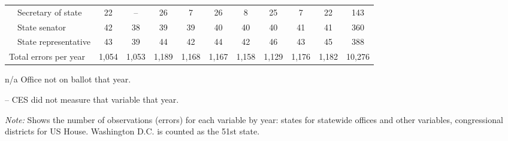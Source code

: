 \begin{table}[!htbp]
{\begin{threeparttable}
\begin{tabular}{lcccccccccc}
~~Secretary of state & 22 & -- & 26 & 7 & 26 & 8 & 25 & 7 & 22 & 143 \\
~~State senator & 42 & 38 & 39 & 39 & 40 & 40 & 40 & 41 & 41 & 360 \\
~~State representative & 43 & 39 & 44 & 42 & 44 & 42 & 46 & 43 & 45 & 388 \\
\midrule
Total errors per year & 1,054 & 1,053 & 1,189 & 1,168 & 1,167 & 1,158 & 1,129 & 1,176 & 1,182 & 10,276 \\
\bottomrule
\end{tabular}
\begin{tablenotes}
\footnotesize
\item n/a Office not on ballot that year.
\item -- CES did not measure that variable that year.
\item \textit{Note:} Shows the number of observations (errors) for each variable by year: states for statewide offices and other variables, congressional districts for US House. Washington D.C. is counted as the 51st state.
\end{tablenotes}
\end{threeparttable}%
}
\end{table}